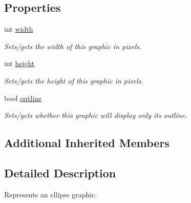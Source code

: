 \subsection*{Properties}
\begin{DoxyCompactItemize}
\item 
\hypertarget{class_picto_1_1_ellipse_graphic_a3639ab7d933e66639680063d356425f5}{int \hyperlink{class_picto_1_1_ellipse_graphic_a3639ab7d933e66639680063d356425f5}{width}}\label{class_picto_1_1_ellipse_graphic_a3639ab7d933e66639680063d356425f5}

\begin{DoxyCompactList}\small\item\em Sets/gets the width of this graphic in pixels. \end{DoxyCompactList}\item 
\hypertarget{class_picto_1_1_ellipse_graphic_a9ce611585fa80f8e0bab9eeb2c7e4a6c}{int \hyperlink{class_picto_1_1_ellipse_graphic_a9ce611585fa80f8e0bab9eeb2c7e4a6c}{height}}\label{class_picto_1_1_ellipse_graphic_a9ce611585fa80f8e0bab9eeb2c7e4a6c}

\begin{DoxyCompactList}\small\item\em Sets/gets the height of this graphic in pixels. \end{DoxyCompactList}\item 
\hypertarget{class_picto_1_1_ellipse_graphic_a84e8f8ac17d8be8172ce09c5a647ca93}{bool \hyperlink{class_picto_1_1_ellipse_graphic_a84e8f8ac17d8be8172ce09c5a647ca93}{outline}}\label{class_picto_1_1_ellipse_graphic_a84e8f8ac17d8be8172ce09c5a647ca93}

\begin{DoxyCompactList}\small\item\em Sets/gets whether this graphic will display only its outline. \end{DoxyCompactList}\end{DoxyCompactItemize}
\subsection*{Additional Inherited Members}


\subsection{Detailed Description}
Represents an ellipse graphic. 

